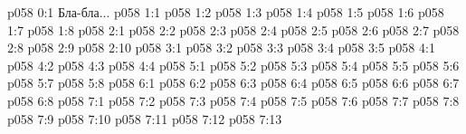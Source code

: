 \author{Носитель Жизни}
\vs p058 0:1  Бла-бла...
\vs p058 1:1 
\vs p058 1:2 \pc 
\vs p058 1:3 
\vs p058 1:4 
\vs p058 1:5 
\vs p058 1:6 
\vs p058 1:7 \pc 
\vs p058 1:8 
\vs p058 2:1 
\vs p058 2:2 \pc 
\vs p058 2:3 
\vs p058 2:4 
\vs p058 2:5 
\vs p058 2:6 \pc 
\vs p058 2:7 
\vs p058 2:8 
\vs p058 2:9 
\vs p058 2:10 
\vs p058 3:1 
\vs p058 3:2 
\vs p058 3:3 
\vs p058 3:4 
\vs p058 3:5 \pc 
{}
\vs p058 4:1 
\vs p058 4:2 \pc 
\vs p058 4:3 \pc 
\vs p058 4:4 
\vs p058 5:1 
\vs p058 5:2 
\vs p058 5:3 
\vs p058 5:4 
\vs p058 5:5 \pc 
\vs p058 5:6 
\vs p058 5:7 
\vs p058 5:8 
\vs p058 6:1 
\vs p058 6:2 \pc 
\vs p058 6:3 
\vs p058 6:4 
\vs p058 6:5 
\vs p058 6:6 
\vs p058 6:7 
\vs p058 6:8 
\vs p058 7:1 
\vs p058 7:2 
\vs p058 7:3 \pc 
\vs p058 7:4 
\vs p058 7:5 
\vs p058 7:6 
\vs p058 7:7 
\vs p058 7:8 \pc 
\vs p058 7:9 
\vs p058 7:10 
\vs p058 7:11 \pc 
\vs p058 7:12 \pc 
\vsetoff
\vs p058 7:13 
\quizlink
